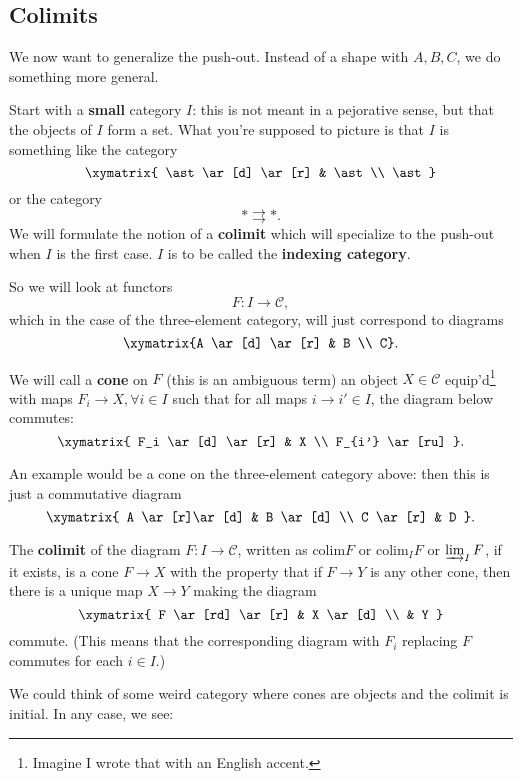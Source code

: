 \subsection{Colimits}


We now want to generalize the push-out. 
Instead of a shape with $A,B,C$, we do something more general.

Start with a \textbf{small} category $I$: this is not meant in a pejorative
sense, but that the objects of $I$ form a set. What you're supposed to picture
is that $I$ is something like the category
\[ 
\xymatrix{
\ast \ar[d] \ar[r] &  \ast \\
\ast
}
\]
or the category
\[ \ast \rightrightarrows \ast.  \]
We will formulate the notion of a \textbf{colimit} which will specialize to the
push-out when $I$ is the first case. $I$ is to be called the \textbf{indexing
category}. 

So we will look at functors 
\[ F: I \to \mathcal{C},  \]
which in the case of the three-element category, will just correspond to
diagrams
\[ \xymatrix{A \ar[d]  \ar[r] &  B \\ C}.  \]

We will call a \textbf{cone} on $F$ (this is an ambiguous term) an object $X
\in \mathcal{C}$ equip'd\footnote{Imagine I wrote that with an English accent.}
with maps $F_i \to X, \forall i \in I$ such that for all maps $i \to i' \in I$,
the diagram below commutes:
\[ \xymatrix{
F_i \ar[d] \ar[r] &  X \\
F_{i'} \ar[ru]
}.\]

An example would be a cone on the three-element category above: then this is
just a commutative diagram
\[ \xymatrix{
A \ar[r]\ar[d]  &  B \ar[d]  \\
C \ar[r] &  D
}.\]

\newcommand{\colim}{\mathrm{colim}}

\begin{definition} 
The \textbf{colimit} of the diagram $F: I \to \mathcal{C}$, written as $\colim
F$ or $\colim_I F $ or $\varinjlim_I F$, if it exists, is a cone $F \to X$ with
the property that if $F \to Y$ is any other cone, then there is a unique map $X
\to Y$ making the diagram
\[ \xymatrix{
F  \ar[rd] \ar[r] &  X \ar[d]  \\
& Y
}\]
commute. (This means that the corresponding diagram with $F_i$ replacing $F$
commutes for each $i \in I$.)
\end{definition} 

We could think of some weird category where cones are objects and the colimit
is initial. In any case, we see:

